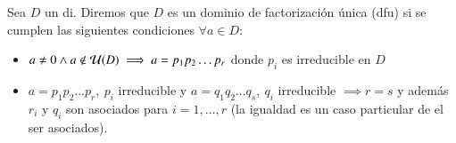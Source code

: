\begin{dfn}
	\label{dfn:dfu}
	Sea $D$ un \gls{di}. Diremos que $D$ es un dominio de factorización única (\gls{dfu}) si se cumplen las siguientes condiciones $\forall a \in D$:
	\begin{itemize}
		\item $a \neq 0 \land a \not\in\mathcal{U}(D) \implies a = p_1p_2\dots p_r$ donde $p_i$ es irreducible en $D$
		\item $a = p_1p_2\dots p_r,\ p_i$ irreducible y $a = q_1q_2 \dots q_s,\ q_i$ irreducible $\implies r = s$ y además $r_i$ y $q_i$ son asociados para $i = 1, \dots, r$ (la igualdad es un caso particular de el ser asociados).
	\end{itemize}
\end{dfn}